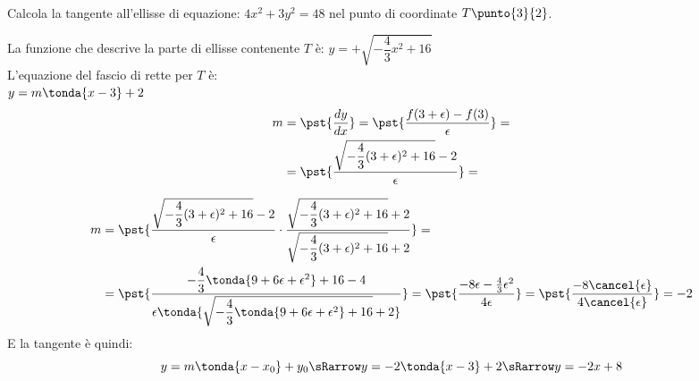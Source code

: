 \begin{esempio}
{~}

\begin{minipage}{.44\textwidth}
Calcola la tangente all'ellisse di equazione:
\(4x^2+3y^2=48\)
nel punto di coordinate \(T\punto{3}{2}\).

La funzione che descrive la parte di ellisse 
contenente \(T\) è:
\(y=+\sqrt{-\dfrac{4}{3}x^2+16}\)\\
L'equazione del fascio di rette per \(T\) è:\\
\(y=m\tonda{x-3}+2\)
\begin{align*}
m&=\pst{\dfrac{d y}{d x}}=
   \pst{\dfrac{f(3+\epsilon)-f(3)}{\epsilon}}=\\
 &=\pst{\dfrac{\sqrt{-\dfrac{4}{3}(3+\epsilon)^2+16}-2}{\epsilon}}=
\end{align*}
\end{minipage}
\hfill
\begin{minipage}{.54\textwidth}
\begin{center}\iperellisse\end{center}
\end{minipage}
\begin{align*}
m&=\pst{\dfrac{\sqrt{-\dfrac{4}{3}(3+\epsilon)^2+16}-2}{\epsilon} \cdot
        \dfrac{\sqrt{-\dfrac{4}{3}(3+\epsilon)^2+16}+2}
              {\sqrt{-\dfrac{4}{3}(3+\epsilon)^2+16}+2}}=\\
 &=\pst{\dfrac{-\dfrac{4}{3}\tonda{9+6\epsilon+\epsilon^2}+16-4}
        {\epsilon
         \tonda{\sqrt{-\dfrac{4}{3}\tonda{9+6\epsilon+\epsilon^2}+16}+2}}}=
   \pst{\dfrac{-8\epsilon-\frac{4}{3}\epsilon^2}{4 \epsilon}}=
   \pst{\dfrac{-8 \cancel{\epsilon}}{4 \cancel{\epsilon}}}=-2
\end{align*}
E la tangente è quindi:
\[y=m \tonda{x-x_0}+y_0 \sRarrow y=-2 \tonda{x-3}+2 \sRarrow y=-2x+8\]

\end{esempio}

